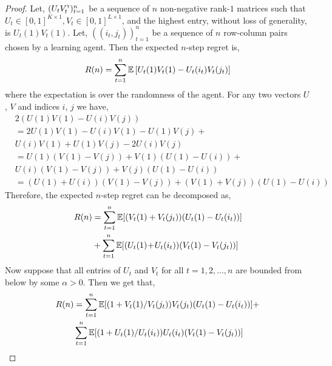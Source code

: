 \begin{proof}
Let, $(U_t V_t^\mathsf{\scriptscriptstyle T})_{t = 1}^n$ be a sequence of $n$ non-negative rank-$1$  matrices such that $U_t \in [0, 1]^{K \times 1}, V_t \in [0, 1]^{L \times 1}$, and the highest entry, without loss of generality, is $U_t(1) V_t(1)$. Let, $((i_t, j_t))_{t = 1}^n$
be a sequence of $n$ row-column pairs chosen by a learning agent. Then the expected $n$-step regret is,
\begin{align*}
R(n) = \sum_{t = 1}^n \mathbb{E} \left[{U_t(1) V_t(1) - U_t(i_t) V_t(j_t)}\right]
\end{align*}
where the expectation is over the randomness of the agent. For any two vectors $U$, $V$ and indices $i$, $j$ we have,
\begin{align*}
& 2 (U(1) V(1) - U(i) V(j)) \\
 & =   2 U(1) V(1)  -  U(i) V(1) -  U(1) V(j) + \\
&     U(i) V(1) + U(1) V(j)  -  2 U(i) V(j) \\
& = U(1) (V(1) - V(j))  + V(1) (U(1) -  U(i))  +\\
&  U(i) (V(1)  - V(j))  + V(j) (U(1)  - U(i)) \\
& = \left(U(1) \!+\! U(i)\right) \left(V(1) \! - \! V(j)\right) \! +\! \left(V(1) \! + \! V(j)\right) \left(U(1) \! - \! U(i)\right)
\end{align*}
Therefore, the expected $n$-step regret can be decomposed as,
\begin{align*}
R(n) &= \sum_{t = 1}^n \mathbb{E}[{(V_t(1) + V_t(j_t)) (U_t(1) - U_t(i_t))}] \\
&+ \sum_{t = 1}^n \mathbb{E}[{(U_t(1) \! + \! U_t(i_t)) (V_t(1) - V_t(j_t))}]
\end{align*}
Now suppose that all entries of $U_t$ and $V_t$ for all $t=1,2,\ldots, n$ are bounded from below by some $\alpha > 0$. Then we get that,
\begin{align*}
R(n)
& = \sum_{t = 1}^n \E[{(1 + V_t(1) / V_t(j_t)) V_t(j_t) (U_t(1) - U_t(i_t))}] +\\
&\sum_{t = 1}^n \E[{(1 + U_t(1) / U_t(i_t)) U_t(i_t) (V_t(1) - V_t(j_t))}] \\

\end{align*}
\end{proof}
